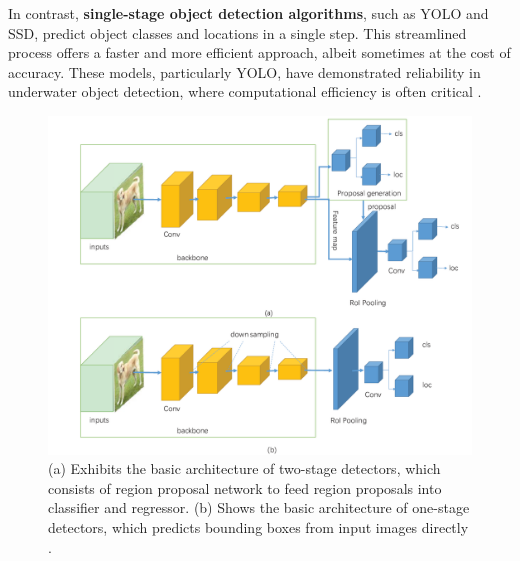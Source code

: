 In contrast, \textbf{single-stage object detection algorithms}, such as YOLO and SSD, predict object classes and locations in a single step. This streamlined process offers a faster and more efficient approach, albeit sometimes at the cost of accuracy. These models, particularly YOLO, have demonstrated reliability in underwater object detection, where computational efficiency is often critical \cite{lotfi2024comparison}.
\begin{figure}[h]
    \centering
    \includegraphics[width=1\linewidth]{images/Object_detector_1stage_vs_2_stage.png}
    \caption{(a) Exhibits the basic architecture of two-stage detectors, which consists of region proposal network to feed region proposals into classifier and regressor. (b) Shows the basic architecture of one-stage detectors, which predicts bounding boxes from input images directly \cite{8825470}.}
    \label{fig:single-two-stage-object-detection}
\end{figure}

